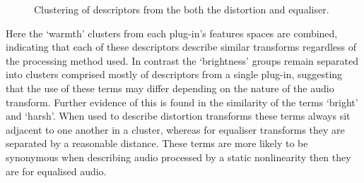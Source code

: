 		\begin{figure}[h!]
			\centering
			\qquad
			\caption{Clustering of descriptors from the both the distortion and equaliser.}
			\label{fig:CombinedClusters}
		\end{figure}

		Here the `warmth' clusters from each plug-in's features spaces are combined, indicating that each of these
		descriptors describe similar transforms regardless of the processing method used. In contrast the
		`brightness' groups remain separated into clusters comprised mostly of descriptors from a single plug-in,
		suggesting that the use of these terms may differ depending on the nature of the audio transform.  Further
		evidence of this is found in the similarity of the terms `bright' and `harsh'. When used to describe
		distortion transforms these terms always sit adjacent to one another in a cluster, whereas for equaliser
		transforms they are separated by a reasonable distance. These terms are more likely to be synonymous when
		describing audio processed by a static nonlinearity then they are for equalised audio. 

